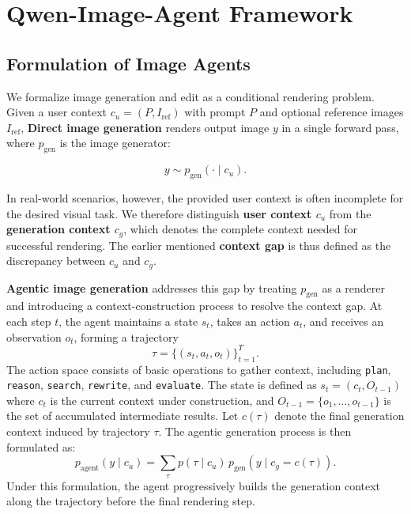 \section{Qwen-Image-Agent Framework}
\subsection{Formulation of Image Agents}
We formalize image generation and edit as a conditional rendering problem. Given a user context $c_u=(P, I_{\mathrm{ref}})$ with prompt $P$ and optional reference images $I_{\mathrm{ref}}$, \textbf{Direct image generation} renders output image $y$ in a single forward pass, where $p_{\mathrm{gen}}$ is the image generator:

\begin{equation}
y \sim p_{\mathrm{gen}}(\cdot \mid c_u).
\end{equation}

In real-world scenarios, however, the provided user context is often incomplete for the desired visual task. We therefore distinguish \textbf{user context $c_u$} from the \textbf{generation context $c_g$}, which denotes the complete context needed for successful rendering. The earlier mentioned \textbf{context gap} is thus defined as the discrepancy between $c_u$ and $c_g$.

\textbf{Agentic image generation} addresses this gap by treating $p_{\mathrm{gen}}$ as a renderer and introducing a context-construction process to resolve the context gap. At each step $t$, the agent maintains a state $s_t$, takes an action $a_t$, and receives an observation $o_t$, forming a trajectory
\begin{equation}
\tau = \{(s_t, a_t, o_t)\}_{t=1}^{T}.
\end{equation}
The action space consists of basic operations to gather context, including \texttt{plan}, \texttt{reason}, \texttt{search}, \texttt{rewrite}, and \texttt{evaluate}. The state is defined as $s_t = (c_t, O_{t-1})$ where $c_t$ is the current context under construction, and $O_{t-1}=\{o_1,\dots,o_{t-1}\}$ is the set of accumulated intermediate results. Let $c(\tau)$ denote the final generation context induced by trajectory $\tau$. The agentic generation process is then formulated as:
\begin{equation}
p_{\mathrm{agent}}(y \mid c_u)
=
\sum_{\tau}
p(\tau \mid c_u)\,
p_{\mathrm{gen}}(y \mid c_g=c(\tau)).
\end{equation}
Under this formulation, the agent progressively builds the generation context along the trajectory before the final rendering step.

